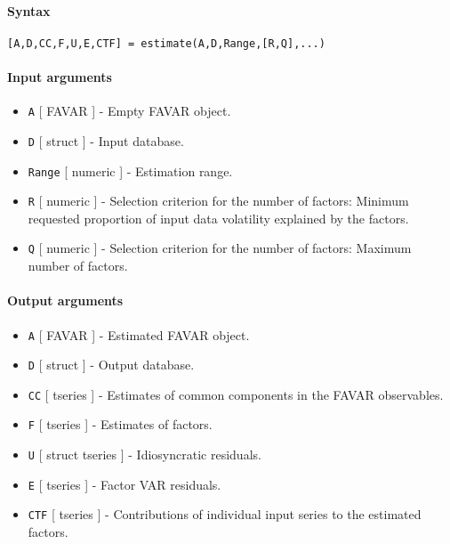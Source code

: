 


	\paragraph{Syntax}\label{syntax}

\begin{verbatim}
[A,D,CC,F,U,E,CTF] = estimate(A,D,Range,[R,Q],...)
\end{verbatim}

\paragraph{Input arguments}\label{input-arguments}

\begin{itemize}
\item
  \texttt{A} {[} FAVAR {]} - Empty FAVAR object.
\item
  \texttt{D} {[} struct {]} - Input database.
\item
  \texttt{Range} {[} numeric {]} - Estimation range.
\item
  \texttt{R} {[} numeric {]} - Selection criterion for the number of
  factors: Minimum requested proportion of input data volatility
  explained by the factors.
\item
  \texttt{Q} {[} numeric {]} - Selection criterion for the number of
  factors: Maximum number of factors.
\end{itemize}

\paragraph{Output arguments}\label{output-arguments}

\begin{itemize}
\item
  \texttt{A} {[} FAVAR {]} - Estimated FAVAR object.
\item
  \texttt{D} {[} struct {]} - Output database.
\item
  \texttt{CC} {[} tseries {]} - Estimates of common components in the
  FAVAR observables.
\item
  \texttt{F} {[} tseries {]} - Estimates of factors.
\item
  \texttt{U} {[} struct \textbar{} tseries {]} - Idiosyncratic
  residuals.
\item
  \texttt{E} {[} tseries {]} - Factor VAR residuals.
\item
  \texttt{CTF} {[} tseries {]} - Contributions of individual input
  series to the estimated factors.
\end{itemize}

